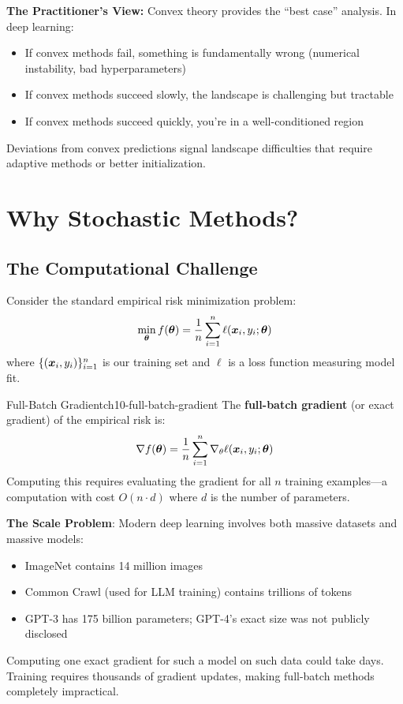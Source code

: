 \documentclass[../../main.tex]{subfiles}
\begin{document}
\begin{principle}
\textbf{The Practitioner's View:} Convex theory provides the ``best case'' analysis. In deep learning:
\begin{itemize}
    \item If convex methods fail, something is fundamentally wrong (numerical instability, bad hyperparameters)
    \item If convex methods succeed slowly, the landscape is challenging but tractable
    \item If convex methods succeed quickly, you're in a well-conditioned region
\end{itemize}
Deviations from convex predictions signal landscape difficulties that require adaptive methods or better initialization.
\end{principle}

\section{Why Stochastic Methods?}
\label{sec:ch10-why-stochastic}

\subsection{The Computational Challenge}

Consider the standard empirical risk minimization problem:
\begin{equation}
\label{eq:ch10-erm}
    \min_{\boldsymbol{\theta}} f(\boldsymbol{\theta}) = \frac{1}{n} \sum_{i=1}^{n} \ell(\boldsymbol{x}_i, y_i; \boldsymbol{\theta})
\end{equation}
where $\{(\boldsymbol{x}_i, y_i)\}_{i=1}^n$ is our training set and $\ell$ is a loss function measuring model fit.

\begin{definition}{Full-Batch Gradient}{ch10-full-batch-gradient}
The \textbf{full-batch gradient} (or exact gradient) of the empirical risk is:
\[
    \nabla f(\boldsymbol{\theta}) = \frac{1}{n} \sum_{i=1}^{n} \nabla_\theta \ell(\boldsymbol{x}_i, y_i; \boldsymbol{\theta})
\]
Computing this requires evaluating the gradient for all $n$ training examples---a computation with cost $O(n \cdot d)$ where $d$ is the number of parameters.
\end{definition}

\begin{important}
\textbf{The Scale Problem}: Modern deep learning involves both massive datasets and massive models:
\begin{itemize}
    \item ImageNet contains 14 million images
    \item Common Crawl (used for LLM training) contains trillions of tokens
    \item GPT-3 has 175 billion parameters; GPT-4's exact size was not publicly disclosed
\end{itemize}
Computing one exact gradient for such a model on such data could take days. Training requires thousands of gradient updates, making full-batch methods completely impractical.
\end{important}
\end{document}
